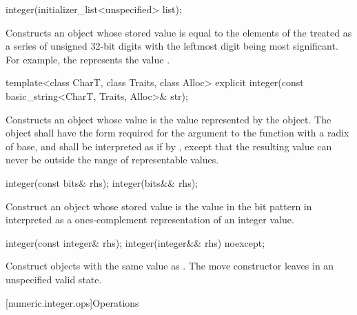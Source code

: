 \begin{itemdecl}
integer(initializer_list<unspecified> list);	
\end{itemdecl}

\begin{itemdescr}
\effects Constructs an object whose stored value is equal to the elements of the  treated as a series of unsigned 32-bit digits with the leftmost digit being most significant. For example, the  represents the value .		
\end{itemdescr}

\begin{itemdecl}
template<class CharT, class Traits, class Alloc>
  explicit integer(const basic_string<CharT, Traits, Alloc>& str);	
\end{itemdecl}

\begin{itemdescr}
\effects Constructs an object whose value is the value represented by the  object. The  object shall have the form required for the  argument to the function  with a radix of base, and shall be interpreted as if by , except that the resulting value can never be outside the range of representable values.		
\end{itemdescr}

\begin{itemdecl}
integer(const bits& rhs);
integer(bits&& rhs);	
\end{itemdecl}

\begin{itemdescr}
\effects Construct an object whose stored value is the value in the bit pattern in  interpreted as a ones-complement representation of an integer value.		
\end{itemdescr}

\begin{itemdecl}
integer(const integer& rhs);
integer(integer&& rhs) noexcept;	
\end{itemdecl}

\begin{itemdescr}
\effects Construct objects with the same value as . The move constructor leaves  in an unspecified valid state.		
\end{itemdescr}

[numeric.integer.ops]{Operations}

